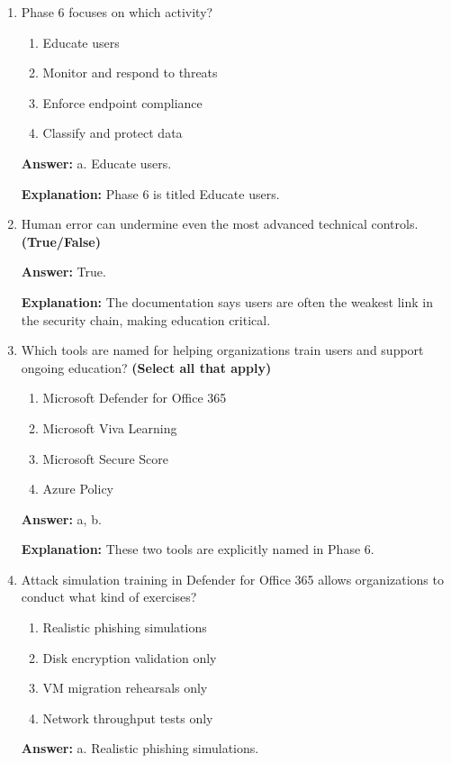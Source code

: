 \documentclass[10pt]{article}
\begin{document}
\begin{enumerate}[leftmargin=*]
\textbf{Explanation:} These are the exact examples given for attackers' ultimate goals.

\item Phase 6 focuses on which activity?
\begin{enumerate}[label=\alph*., leftmargin=1.5em]
\item Educate users
\item Monitor and respond to threats
\item Enforce endpoint compliance
\item Classify and protect data
\end{enumerate}
\textbf{Answer:} a. Educate users.

\textbf{Explanation:} Phase 6 is titled Educate users.

\item Human error can undermine even the most advanced technical controls. \textbf{(True/False)}

\textbf{Answer:} True.

\textbf{Explanation:} The documentation says users are often the weakest link in the security chain, making education critical.

\item Which tools are named for helping organizations train users and support ongoing education? \textbf{(Select all that apply)}
\begin{enumerate}[label=\alph*., leftmargin=1.5em]
\item Microsoft Defender for Office 365
\item Microsoft Viva Learning
\item Microsoft Secure Score
\item Azure Policy
\end{enumerate}
\textbf{Answer:} a, b.

\textbf{Explanation:} These two tools are explicitly named in Phase 6.

\item Attack simulation training in Defender for Office 365 allows organizations to conduct what kind of exercises?
\begin{enumerate}[label=\alph*., leftmargin=1.5em]
\item Realistic phishing simulations
\item Disk encryption validation only
\item VM migration rehearsals only
\item Network throughput tests only
\end{enumerate}
\textbf{Answer:} a. Realistic phishing simulations.


\end{enumerate}
\end{document}
